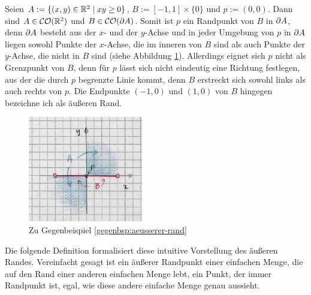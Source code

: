    \begin{gegenbsp}\label{gegenbsp:aeusserer-rand}
        Seien $A := \{(x,y) \in \mathbb{R}^2 \mid xy \geq 0\}$, $B := [-1,1] \times \{0\}$ und $p := (0,0)$. 
        Dann sind $A \in \mathcal{CO}(\mathbb{R}^2)$ und $B \in \mathcal{CO}(\partial A)$.
        Somit ist $p$ ein Randpunkt von $B$ in $\partial A$, denn $\partial A$ besteht aus der $x$- und der $y$-Achse und in jeder Umgebung von $p$ in $\partial A$ liegen sowohl Punkte der $x$-Achse, die im inneren von $B$ sind als auch Punkte der $y$-Achse, die nicht in $B$ sind (siehe Abbildung \ref{fig:kein-aeusserer-rand}).
        Allerdings eignet sich $p$ nicht als Grenzpunkt von $B$, denn für $p$ lässt sich nicht eindeutig eine Richtung festlegen, \glqq aus der die durch $p$ begrenzte Linie kommt\grqq, denn $B$ erstreckt sich sowohl links als auch rechts von $p$.
        Die Endpunkte $(-1,0)$ und $(1,0)$ von $B$ hingegen bezeichne ich als äußeren Rand.
    \end{gegenbsp}
    
    \begin{figure}[ht]
        \centering
        \includegraphics[width=5cm]{gfx/kein-aeusserer-rand.png}
        \caption{Zu Gegenbeispiel \ref{gegenbsp:aeusserer-rand}}
        \label{fig:kein-aeusserer-rand}
    \end{figure}

    Die
    folgende Definition formalisiert diese intuitive Vorstellung des äußeren Randes.
    Vereinfacht gesagt ist ein äußerer Randpunkt einer einfachen Menge, die auf den Rand einer anderen einfachen Menge \glqq lebt\grqq, ein Punkt, der immer Randpunkt ist, egal, wie diese andere einfache Menge genau aussieht.

